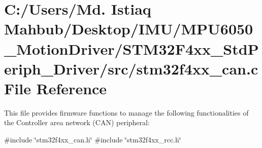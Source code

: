 \section{C\+:/\+Users/\+Md. Istiaq Mahbub/\+Desktop/\+I\+M\+U/\+M\+P\+U6050\+\_\+\+Motion\+Driver/\+S\+T\+M32\+F4xx\+\_\+\+Std\+Periph\+\_\+\+Driver/src/stm32f4xx\+\_\+can.c File Reference}
\label{stm32f4xx__can_8c}


This file provides firmware functions to manage the following functionalities of the Controller area network (C\+AN) peripheral\+:  


{\ttfamily \#include \char`\"{}stm32f4xx\+\_\+can.\+h\char`\"{}}\newline
{\ttfamily \#include \char`\"{}stm32f4xx\+\_\+rcc.\+h\char`\"{}}\newline
